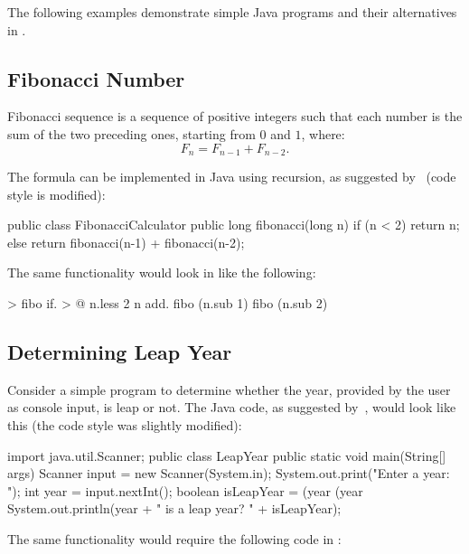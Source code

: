 The following examples demonstrate simple Java programs and their alternatives
in \eo{}.

\subsection{Fibonacci Number}

Fibonacci sequence is a sequence of positive integers such that
each number is the sum of the two preceding ones, starting from $0$ and $1$, where:
\begin{equation*}
F_n = F_{n-1} + F_{n-2}.
\end{equation*}

The formula can be implemented in Java using recursion, as suggested
by~\citet[p.743]{deitel2007java} (code style is modified):

\begin{eocode}
public class FibonacciCalculator {
  public long fibonacci(long n) {
    if (n < 2) {
      return n;
    } else {
      return fibonacci(n-1) + fibonacci(n-2);
    }
  }
}
\end{eocode}

The same functionality would look in \eo{} like the following:

\begin{eocode}
[n] > fibo
  if. > @
    n.less 2
    n
    add.
      fibo (n.sub 1)
      fibo (n.sub 2)
\end{eocode}

\subsection{Determining Leap Year}

Consider a simple program to determine whether the year, provided
by the user as console input, is leap or not. The Java code,
as suggested by~\citet[pp.105--106]{liang2012}, would look like this
(the code style was slightly modified):

\begin{eocode}
import java.util.Scanner;
public class LeapYear {
  public static void main(String[] args) {
    Scanner input = new Scanner(System.in);
    System.out.print("Enter a year: ");
    int year = input.nextInt();
    boolean isLeapYear =
      (year %
      (year %
    System.out.println(year +
      " is a leap year? " + isLeapYear);
  }
}
\end{eocode}

The same functionality would require the following code in \eo{}:

